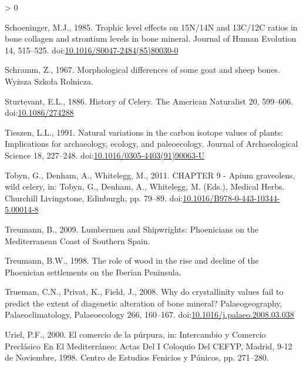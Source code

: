 \documentclass[5p]{elsarticle} %
\newlength{\cslhangindent}
\newenvironment{CSLReferences}[2] %
 {%
  \setlength{\parindent}{0pt}
  \ifodd #1 \everypar{\setlength{\hangindent}{\cslhangindent}}\ignorespaces\fi
  \ifnum #2 > 0
  \setlength{\parskip}{#2\baselineskip}
  \fi
 }%
 {}
\begin{document}
\begin{CSLReferences}{1}{0}
\leavevmode\hypertarget{ref-schoeninger85}{}%
Schoeninger, M.J., 1985. Trophic level effects on {15N}/{14N} and {13C}/{12C} ratios in bone collagen and strontium levels in bone mineral. Journal of Human Evolution 14, 515--525. doi:\href{https://doi.org/10.1016/S0047-2484(85)80030-0}{10.1016/S0047-2484(85)80030-0}

\leavevmode\hypertarget{ref-schramm67}{}%
Schramm, Z., 1967. Morphological differences of some goat and sheep bones. {Wyższa Szkoła Rolnicza}.

\leavevmode\hypertarget{ref-sturtevant86}{}%
Sturtevant, E.L., 1886. History of {Celery}. The American Naturalist 20, 599--606. doi:\href{https://doi.org/10.1086/274288}{10.1086/274288}

\leavevmode\hypertarget{ref-tieszen91}{}%
Tieszen, L.L., 1991. Natural variations in the carbon isotope values of plants: {Implications} for archaeology, ecology, and paleoecology. Journal of Archaeological Science 18, 227--248. doi:\href{https://doi.org/10.1016/0305-4403(91)90063-U}{10.1016/0305-4403(91)90063-U}

\leavevmode\hypertarget{ref-tobyn_etal11}{}%
Tobyn, G., Denham, A., Whitelegg, M., 2011. {CHAPTER} 9 - {Apium} graveolens, wild celery, in: Tobyn, G., Denham, A., Whitelegg, M. (Eds.), Medical {Herbs}. {Churchill Livingstone}, {Edinburgh}, pp. 79--89. doi:\href{https://doi.org/10.1016/B978-0-443-10344-5.00014-8}{10.1016/B978-0-443-10344-5.00014-8}

\leavevmode\hypertarget{ref-treumann09}{}%
Treumann, B., 2009. Lumbermen and {Shipwrights}: {Phoenicians} on the {Mediterranean Coast} of {Southern Spain}.

\leavevmode\hypertarget{ref-treumann98}{}%
Treumann, B.W., 1998. The role of wood in the rise and decline of the {Phoenician} settlements on the {Iberian Peninsula}.

\leavevmode\hypertarget{ref-trueman_etal08}{}%
Trueman, C.N., Privat, K., Field, J., 2008. Why do crystallinity values fail to predict the extent of diagenetic alteration of bone mineral? Palaeogeography, Palaeoclimatology, Palaeoecology 266, 160--167. doi:\href{https://doi.org/10.1016/j.palaeo.2008.03.038}{10.1016/j.palaeo.2008.03.038}

\leavevmode\hypertarget{ref-uriel00}{}%
Uriel, P.F., 2000. El comercio de la púrpura, in: Intercambio y Comercio Preclásico En El {Mediterráneo}: Actas Del {I} Coloquio Del {CEFYP}, {Madrid}, 9-12 de Noviembre, 1998. {Centro de Estudios Fenicios y Púnicos}, pp. 271--280.


\end{CSLReferences}
\end{document}
